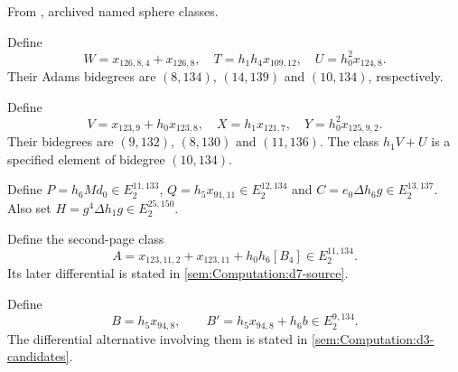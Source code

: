 \begin{definition}
\label{sem:Computation:w-t-u}
From \cite{LinProgram}, archived named sphere classes.\par
{}
Define
\[W=x_{126,8,4}+x_{126,8},\quad T=h_1h_4x_{109,12},\quad U=h_0^2x_{124,8}.\]
Their Adams bidegrees are $(8,134)$, $(14,139)$ and $(10,134)$, respectively.

Define
\[V=x_{123,9}+h_0x_{123,8},\quad X=h_1x_{121,7},\quad Y=h_0^2x_{125,9,2}.\]
Their bidegrees are $(9,132)$, $(8,130)$ and $(11,136)$. The class $h_1V+U$ is a specified element of bidegree $(10,134)$.

Define $P=h_6Md_0\in E_2^{11,133}$, $Q=h_5x_{91,11}\in E_2^{12,134}$ and $C=e_0\Delta h_6g\in E_2^{13,137}$. Also set $H=g^4\Delta h_1g\in E_2^{25,150}$.

Define the second-page class
\[A=x_{123,11,2}+x_{123,11}+h_0h_6[B_4]\in E_2^{11,134}.\]
Its later differential is stated in \ref{sem:Computation:d7-source}.

Define
\[B=h_5x_{94,8},\qquad B'=h_5x_{94,8}+h_6b\in E_2^{9,134}.\]
The differential alternative involving them is stated in
\ref{sem:Computation:d3-candidates}.
\end{definition}


